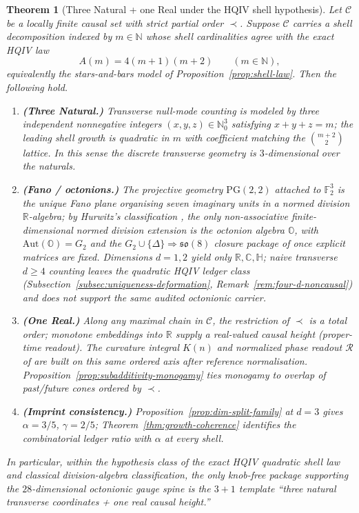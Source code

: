 \documentclass[11pt]{amsart}
\newtheorem{theorem}{Theorem}[section]
\begin{document}
\begin{theorem}[Three Natural + one Real under the HQIV shell hypothesis]
\label{thm:three-natural-one-real}
Let \(\mathcal{C}\) be a locally finite causal set with strict partial order \(\prec\). Suppose \(\mathcal{C}\) carries a shell decomposition indexed by \(m\in\mathbb{N}\) whose shell cardinalities agree with the exact HQIV law
\[
A(m)=4(m+1)(m+2)\qquad (m\in\mathbb{N}),
\]
equivalently the stars-and-bars model of Proposition~\ref{prop:shell-law}. Then the following hold.
\begin{enumerate}
  \item\label{it:three-natural} \textbf{(Three Natural.)} Transverse null-mode counting is modeled by three independent nonnegative integers \((x,y,z)\in\mathbb{N}_0^3\) satisfying \(x+y+z=m\); the leading shell growth is quadratic in \(m\) with coefficient matching the \(\binom{m+2}{2}\) lattice. In this sense the discrete transverse geometry is \(3\)-dimensional over the naturals.
  \item\label{it:octonion} \textbf{(Fano / octonions.)} The projective geometry \(\mathrm{PG}(2,2)\) attached to \(\mathbb{F}_2^3\) is the unique Fano plane organising seven imaginary units in a normed division \(\mathbb{R}\)-algebra; by Hurwitz's classification \cite{baez2002,springer2000}, the only non-associative finite-dimensional normed division extension is the octonion algebra \(\mathbb{O}\), with \(\mathrm{Aut}(\mathbb{O})=G_2\) and the \(G_2\cup\{\Delta\}\Rightarrow \mathfrak{so}(8)\) closure package of \cite{hqiv-so8-paper} once explicit matrices are fixed. Dimensions \(d=1,2\) yield only \(\mathbb{R},\mathbb{C},\mathbb{H}\); naive transverse \(d\ge 4\) counting leaves the quadratic HQIV ledger class (Subsection~\ref{subsec:uniqueness-deformation}, Remark~\ref{rem:four-d-noncausal}) and does not support the same audited octonionic carrier.
  \item\label{it:one-real} \textbf{(One Real.)} Along any maximal chain in \(\mathcal{C}\), the restriction of \(\prec\) is a total order; monotone embeddings into \(\mathbb{R}\) supply a real-valued causal height (proper-time readout). The curvature integral \(K(n)\) and normalized phase readout \(\mathcal{R}\) of \cite{hqiv-so8-paper} are built on this same ordered axis after reference normalisation. Proposition~\ref{prop:subadditivity-monogamy} ties monogamy to overlap of past/future cones ordered by \(\prec\).
  \item\label{it:imprint} \textbf{(Imprint consistency.)} Proposition~\ref{prop:dim-split-family} at \(d=3\) gives \(\alpha=3/5\), \(\gamma=2/5\); Theorem~\ref{thm:growth-coherence} identifies the combinatorial ledger ratio with \(\alpha\) at every shell.
\end{enumerate}
In particular, within the hypothesis class of the exact HQIV quadratic shell law and classical division-algebra classification, the only knob-free package supporting the \(28\)-dimensional octonionic gauge spine is the \(3{+}1\) template ``three natural transverse coordinates + one real causal height.''
\end{theorem}
\end{document}
